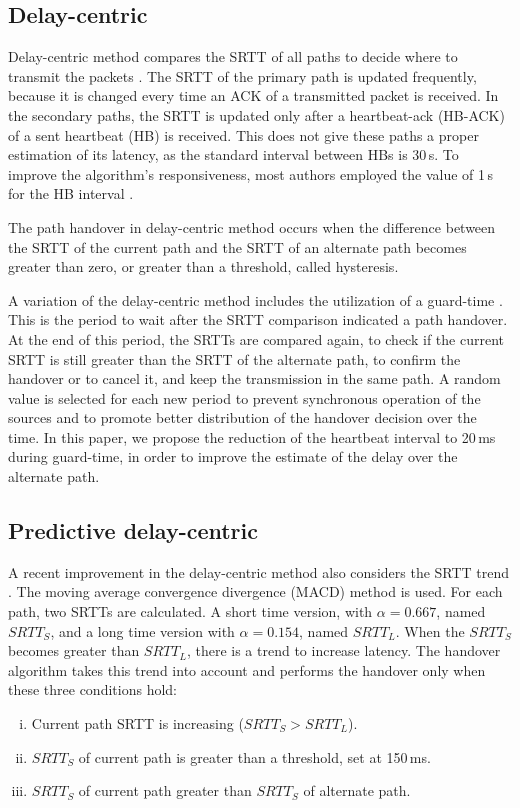 \documentclass{sbrt2015}
\begin{document}
  \subsection{Delay-centric}

  Delay-centric method compares the SRTT of all paths to decide where to transmit the packets \cite{Kelly2004}. The SRTT of the primary path is updated frequently, because it is changed every time an ACK of a transmitted packet is received. In the secondary paths, the SRTT is updated only after a heartbeat-ack (HB-ACK) of a sent heartbeat (HB) is received. This does not give these paths a proper estimation of its latency, as the standard interval between HBs is 30\,s. To improve the algorithm's responsiveness, most authors employed the value of 1\,s for the HB interval \cite{Noonan2004b}\cite{Gavriloff2009}\cite{Torres2014}.

The path handover in delay-centric method occurs when the difference between the SRTT of the current path and the SRTT of an alternate path becomes greater than zero, or greater than a threshold, called hysteresis.

A variation of the delay-centric method includes the utilization of a guard-time \cite{Leung2012}. This is the period to wait after the SRTT comparison indicated a path handover. At the end of this period, the SRTTs are compared again, to check if the current SRTT is still greater than the SRTT of the alternate path, to confirm the handover or to cancel it, and keep the transmission in the same path. A random value is selected for each new period to prevent synchronous operation of the sources and to promote better distribution of the handover decision over the time. In this paper, we propose the reduction of the heartbeat interval to 20\,ms during guard-time, in order to improve the estimate of the delay over the alternate path.

  \subsection{Predictive delay-centric}

  A recent improvement in the delay-centric method also considers the SRTT trend \cite{Torres2014}. The moving average convergence divergence (MACD) method is used. For each path, two SRTTs are calculated. A short time version, with $\alpha = 0.667$, named $SRTT_S$, and a long time version with $\alpha = 0.154$, named $SRTT_L$. When the $SRTT_S$ becomes greater than $SRTT_L$, there is a trend to increase latency. The handover algorithm takes this trend into account and performs the handover only when these three conditions hold:
\begin{enumerate}[i)]
 \item Current path SRTT is increasing ($SRTT_S > SRTT_L$).
 \item $SRTT_S$ of current path is greater than a threshold, set at 150\,ms.
 \item $SRTT_S$ of current path greater than $SRTT_S$ of alternate path.
\end{enumerate}
\end{document}
